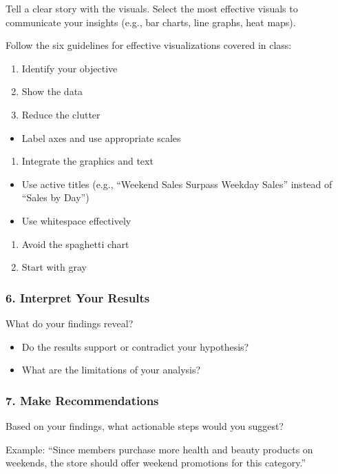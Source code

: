 \documentclass[
  11pt,
]{article}
\providecommand{\tightlist}{%
  \setlength{\itemsep}{0pt}\setlength{\parskip}{0pt}}
\begin{document}
Tell a clear story with the visuals. Select the most effective visuals
to communicate your insights (e.g., bar charts, line graphs, heat maps).

Follow the six guidelines for effective visualizations covered in class:

\begin{enumerate}
\def\labelenumi{\arabic{enumi}.}
\item
  Identify your objective
\item
  Show the data
\item
  Reduce the clutter
\end{enumerate}

\begin{itemize}
\tightlist
\item
  Label axes and use appropriate scales
\end{itemize}

\begin{enumerate}
\def\labelenumi{\arabic{enumi}.}
\setcounter{enumi}{3}
\tightlist
\item
  Integrate the graphics and text
\end{enumerate}

\begin{itemize}
\item
  Use active titles (e.g., ``Weekend Sales Surpass Weekday Sales''
  instead of ``Sales by Day'')
\item
  Use whitespace effectively
\end{itemize}

\begin{enumerate}
\def\labelenumi{\arabic{enumi}.}
\setcounter{enumi}{4}
\item
  Avoid the spaghetti chart
\item
  Start with gray
\end{enumerate}

\subsubsection{6. Interpret Your Results}\label{interpret-your-results}

What do your findings reveal?

\begin{itemize}
\item
  Do the results support or contradict your hypothesis?
\item
  What are the limitations of your analysis?
\end{itemize}

\subsubsection{7. Make Recommendations}\label{make-recommendations}

Based on your findings, what actionable steps would you suggest?

Example: ``Since members purchase more health and beauty products on
weekends, the store should offer weekend promotions for this category.''
\end{document}
